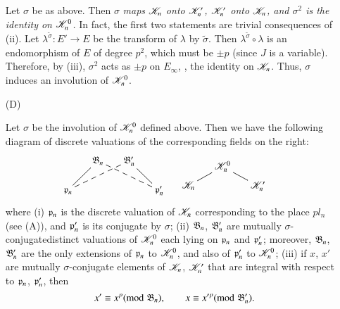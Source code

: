 \begin{itemize}
Let $\sigma$ be as above. Then $\sigma$ \textit{maps $\mathscr{K}_n$ onto $\mathscr{K}'_n$, $\mathscr{K}'_n$ onto $\mathscr{K}_n$, and $\sigma^2$ is the identity on $\mathscr{K}^0_n$.} In fact, the first two statements are trivial consequences of (ii). Let $\lambda^{\tilde{\sigma}} : E' \to E$ be the transform of $\lambda$ by $\tilde{\sigma}$. Then $\lambda^{\tilde{\sigma}} \circ \lambda$ is an endomorphism of $E$ of degree $p^2$, which must be $\pm p$ (since $J$ is a variable). Therefore, by (iii), $\sigma^2$ acts as $\pm p$ on $E_\infty$, \ie, the identity on $\mathscr{K}_n$. Thus, $\sigma$ induces an involution of $\mathscr{K}^0_n$.

\item[(D)]
\setcounter{subprop}{3}
\begin{subprop}\label{art6-subprop5.2.4}
Let $\sigma$ be the involution of $\mathscr{K}^0_n$ defined above. Then we have the following diagram of discrete valuations of the corresponding fields on the right:
\setcounter{equation}{4}
\begin{equation}
\vcenter{
\xymatrix@R=0.5cm@C=0.5cm{
& \fB_n \ar@{-}[dl] \ar@{--}[drr] & \fB'_n \ar@{-}[dr] \ar@{--}[dll] & \\
\fp_n & & & \fp'_n
}}
\quad\;
\vcenter{
\xymatrix@R=-0.05cm@C=0.5cm{
& \sK^0_n \ar@{-}[ddr]\ar@{-}[ddl]& \\
& & & \\
\sK_n && \sK'_n
}}
\label{art6-eq5.2.5}
\end{equation}
where (i) $\mathfrak{p}_n$ is the discrete valuation of $\mathscr{K}_n$ corresponding to the place $pl_n$ (see (A)), and $\mathfrak{p}'_n$ is its conjugate by $\sigma$; (ii) $\mathfrak{B}_n$, $\mathfrak{B}'_n$ are mutually $\sigma$-conjugate\pageoriginale distinct valuations of $\mathscr{K}^0_n$ each lying on $\mathfrak{p}_n$ and $\mathfrak{p}'_n$; moreover, $\mathfrak{B}_n$, $\mathfrak{B}'_n$ are the only extensions of $\mathfrak{p}_n$ to $\mathscr{K}^0_n$, and also of $\mathfrak{p}'_n$ to $\mathscr{K}^0_n$; (iii) if $x$, $x'$ are mutually $\sigma$-conjugate elements of $\mathscr{K}_n$, $\mathscr{K}'_n$ that are integral with respect to $\mathfrak{p}_n$, $\mathfrak{p}'_n$, then
\begin{equation}
x'  \equiv x^p ({\rm{mod}}\kern.3em \mathfrak{B}_n), \qquad  x \equiv x'^p ({\rm{mod}}\kern.3em \mathfrak{B}'_n) . 
\label{art6-eq5.2.6}
\end{equation}
\end{subprop}


\end{itemize}
